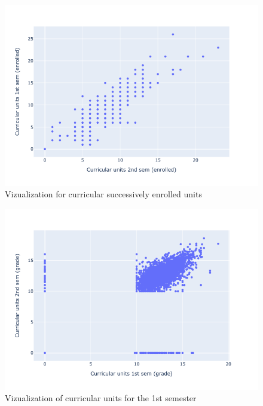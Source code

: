 \documentclass[
  letterpaper,
  DIV=11,
  numbers=noendperiod]{scrartcl}
\begin{document}
\begin{figure}

{\centering \includegraphics{report_AzadhdhinNedalYunisAlFraijat_files/figure-pdf/fig-cur-units-enrolled-output-1.png}

}

\caption{\label{fig-cur-units-enrolled}Vizualization for curricular
successively enrolled units}

\end{figure}

\begin{figure}

{\centering \includegraphics{report_AzadhdhinNedalYunisAlFraijat_files/figure-pdf/fig-cur-grade-output-1.png}

}

\caption{\label{fig-cur-grade}Vizualization of curricular units for the
1st semester}

\end{figure}
\end{document}
